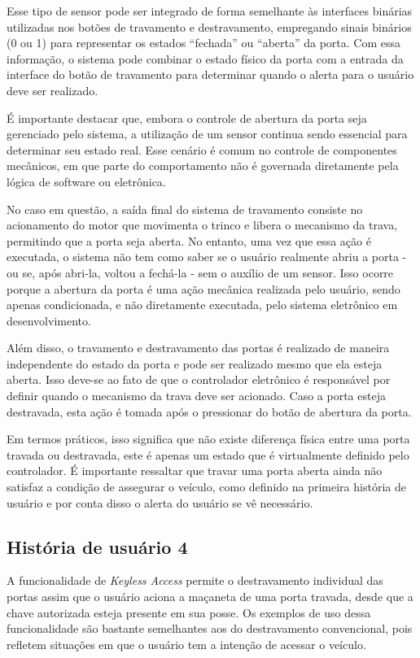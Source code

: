 Esse tipo de sensor pode ser integrado de forma semelhante às interfaces binárias utilizadas nos botões de travamento e destravamento, empregando sinais 
binários (0 ou 1) para representar os estados ``fechada'' ou ``aberta'' da porta. Com essa informação, o sistema pode combinar o estado físico da porta com a 
entrada da interface do botão de travamento para determinar quando o alerta para o usuário deve ser realizado.

É importante destacar que, embora o controle de abertura da porta seja gerenciado pelo sistema, a utilização de um sensor continua sendo essencial para 
determinar seu estado real. Esse cenário é comum no controle de componentes mecânicos, em que parte do comportamento não é governada diretamente pela 
lógica de software ou eletrônica.

No caso em questão, a saída final do sistema de travamento consiste no acionamento do motor que movimenta o trinco e libera o mecanismo da trava, permitindo 
que a porta seja aberta. No entanto, uma vez que essa ação é executada, o sistema não tem como saber se o usuário realmente abriu a porta - ou se, após abri-la, 
voltou a fechá-la - sem o auxílio de um sensor. Isso ocorre porque a abertura da porta é uma ação mecânica realizada pelo usuário, sendo apenas condicionada, e 
não diretamente executada, pelo sistema eletrônico em desenvolvimento.

Além disso, o travamento e destravamento das portas é realizado de maneira independente do estado da porta e pode ser realizado mesmo que ela esteja aberta. Isso 
deve-se ao fato de que o controlador eletrônico é responsável por definir quando o mecanismo da trava deve ser acionado. Caso a porta esteja destravada, esta ação 
é tomada após o pressionar do botão de abertura da porta.

Em termos práticos, isso significa que não existe diferença física entre uma porta travada ou destravada, este é apenas um estado que é virtualmente definido 
pelo controlador. É importante ressaltar que travar uma porta aberta ainda não satisfaz a condição de assegurar o veículo, como definido na primeira história 
de usuário e por conta disso o alerta do usuário se vê necessário.

\subsection{História de usuário 4}

A funcionalidade de \textit{Keyless Access} permite o destravamento individual das portas assim que o usuário aciona a maçaneta de uma porta travada, desde que a chave 
autorizada esteja presente em sua posse. Os exemplos de uso dessa funcionalidade são bastante semelhantes aos do destravamento convencional, pois refletem 
situações em que o usuário tem a intenção de acessar o veículo. 

